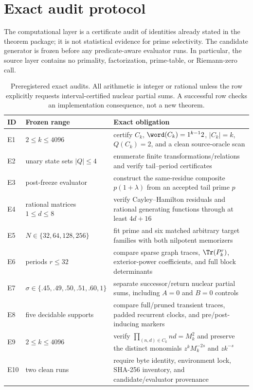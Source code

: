 \section{Exact audit protocol}
\label{sec:audit}

The computational layer is a certificate audit of identities already stated
in the theorem package; it is not statistical evidence for prime
selectivity.  The candidate generator is frozen before any predicate-aware
evaluator runs.  In particular, the source layer contains no primality,
factorization, prime-table, or Riemann-zero call.

\begin{table}[t]
\centering
\caption{Preregistered exact audits.  All arithmetic is integer or rational
unless the row explicitly requests interval-certified nuclear partial
sums.  A successful row checks an implementation consequence, not a new
theorem.}
\label{tab:audits}
\small
\begin{tabularx}{\textwidth}{L{1.0cm}L{3.6cm}Y}
\toprule
ID & Frozen range & Exact obligation \\
\midrule
E1 & $2\le k\le4096$
& certify $C_k$, $\word(C_k)=1^{k-1}2$, $|C_k|=k$, $Q(C_k)=2$, and a clean source-oracle scan \\
E2 & unary state sets $|Q|\le4$
& enumerate finite transformations/relations and verify tail--period certificates \\
E3 & post-freeze evaluator
& construct the same-residue composite $p(1+\lambda)$ from an accepted tail prime $p$ \\
E4 & rational matrices $1\le d\le8$
& verify Cayley--Hamilton residuals and rational generating functions through at least $4d+16$ \\
E5 & $N\in\{32,64,128,256\}$
& fit prime and six matched arbitrary target families with both nilpotent memorizers \\
E6 & periods $r\le32$
& compare sparse graph traces, $\Tr(P_k^r)$, exterior-power coefficients, and full block determinants \\
E7 & $\sigma\in\{.45,.49,.50,.51,.60,1\}$
& separate successor/return nuclear partial sums, including $A=0$ and $B=0$ controls \\
E8 & five decidable supports
& compare full/pruned transient traces, padded recurrent clocks, and pre/post-inducing markers \\
E9 & $2\le k\le4096$
& verify $\prod_{(n,d)\in C_k}nd=M_k^2$ and preserve the distinct monomials $z^kM_k^{-2s}$ and $zk^{-s}$ \\
E10 & two clean runs
& require byte identity, environment lock, SHA-256 inventory, and candidate/evaluator provenance \\
\bottomrule
\end{tabularx}
\end{table}

